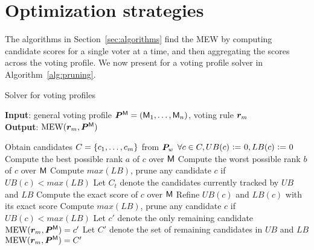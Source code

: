 \section{Optimization strategies}
\label{sec:optimize}

The algorithms in Section~\ref{sec:algorithms} find the MEW by computing candidate scores for a single voter at a time, and then aggregating the scores across the voting profile.
We now present  for a voting profile solver in Algorithm~\ref{alg:pruning}.

\begin{algorithm}[tb!]
  \small 
  \raggedright
  \caption{Solver for voting profiles}
  \label{alg:pruning}
  \textbf{Input}: general voting profile $\probaVP=(\enum[n]{\model})$, voting rule $\vr_m$ \\
  \textbf{Output}: $\mew(\vr_m, \probaVP)$
  
  \begin{algorithmic}[1]
    \STATE {}
    \STATE Obtain candidates $C = \set{\enum{c}}$ from $\VP_w$
    \STATE $\forall c \in C, UB(c) {\defeq} 0, LB(c) {\defeq} 0$ \label{alg:pruning:bounds:1}
    \STATE Compute the best possible rank $a$ of $c$ over $\model$
    \STATE Compute the worst possible rank $b$ of $c$ over $\model$
    \STATE {} \label{alg:pruning:sum}
    \ENDFOR
    \ENDFOR \label{alg:pruning:bounds:2}
    \STATE Compute $max(LB)$, prune any candidate $c$ if $UB(c) < max(LB)$ \label{alg:pruning:prune:1}
     \label{alg:pruning:for:1}
    \STATE Let $C_t$ denote the candidates currently tracked by $UB$ and $LB$
    \STATE Compute the exact score of $c$ over $\model$
    \STATE Refine $UB(c)$ and $LB(c)$ with its exact score 
    \ENDFOR
    \STATE Compute $max(LB)$, prune any candidate $c$ if $UB(c) < max(LB)$ \label{alg:pruning:prune:2}
    \STATE Let $c'$ denote the only remaining candidate
    \RETURN $\mew(\vr_m, \probaVP) = c'$ \label{alg:pruning:ret:1}
    \ENDIF
    \ENDFOR \label{alg:pruning:for:2}
    \STATE Let $C'$ denote the set of remaining candidates in $UB$ and $LB$
    \RETURN $\mew(\vr_m, \probaVP) = C'$
  \end{algorithmic}
\end{algorithm}

